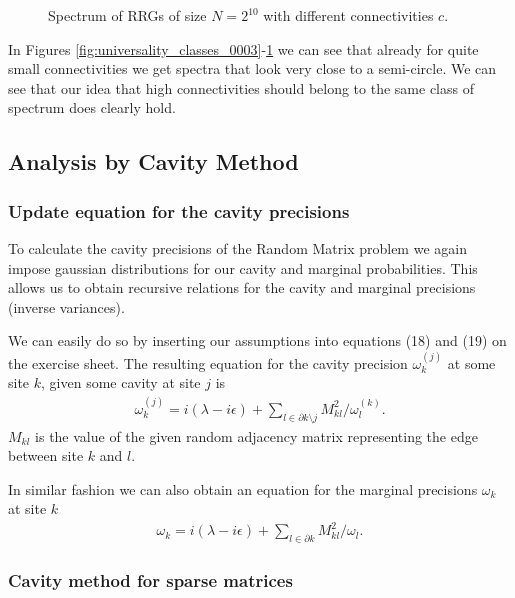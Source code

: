 \documentclass[../main.tex]{subfiles}
\begin{document}
\begin{figure}[htpb]
\begin{subfigure}{\textwidth}
        \caption{}
        \label{fig:universality_classes_0511}
    \end{subfigure}
    \caption{Spectrum of RRGs of size $N=2^{10}$ with different connectivities $c$.}
    \label{fig:universality_classes}
\end{figure}

In Figures \ref{fig:universality_classes_0003}-\ref{fig:universality_classes_0511} we can see that already for quite small connectivities we get spectra that look very close to a semi-circle.
We can see that our idea that high connectivities should belong to the same class of spectrum does clearly hold.


\subsection{Analysis by Cavity Method}
\setcounter{subsubsection}{4}

\subsubsection{Update equation for the cavity precisions}

To calculate the cavity precisions of the Random Matrix problem we again impose gaussian distributions for our cavity and marginal probabilities.
This allows us to obtain recursive relations for the cavity and marginal precisions (inverse variances).

We can easily do so by inserting our assumptions into equations (18) and (19) on the exercise sheet.
The resulting equation for the cavity precision $\omega^{(j)}_k$ at some site $k$, given some cavity at site $j$ is 
\begin{align}
\label{eq:cavity_precs}
    \omega^{(j)}_k = i(\lambda - i \epsilon) + 
    \sum\limits_{l \in \partial k \setminus j }^{ } M^2_{ kl }/ \omega^{(k)}_l 
.\end{align}
$M_{ kl } $ is the value of the given random adjacency matrix representing the edge between site $k$ and $l$.

In similar fashion we can also obtain an equation for the marginal precisions $\omega_k$ at site $k$
\begin{align}
\label{eq:marginals_precs}
    \omega_k = i(\lambda - i \epsilon) + 
    \sum\limits_{l \in \partial k}^{ } M^2_{ kl }/ \omega_l 
.\end{align}

\subsubsection{Cavity method for sparse matrices}
\end{document}
